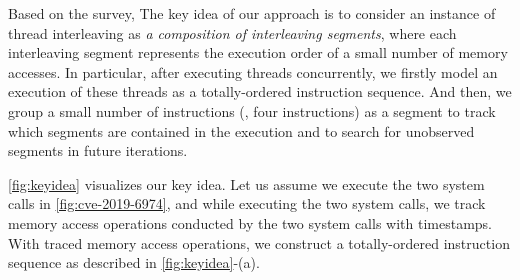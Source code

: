 %
\begin{figure}[t]
  \hfill
  \caption{}
  \label{fig:keyidea}
\end{figure}
%
Based on the survey, The key idea of our approach is to consider an
instance of thread interleaving as \textit{a composition of
  interleaving segments}, where each interleaving segment represents
the execution order of a small number of memory accesses.
%
In particular, after executing threads concurrently, we firstly model
an execution of these threads as a totally-ordered instruction
sequence.
%
And then, we group a small number of instructions (\eg, four
instructions) as a segment to track which segments are contained in
the execution and to search for unobserved segments in future
iterations.


\autoref{fig:keyidea} visualizes our key idea.
%
Let us assume we execute the two system calls in
\autoref{fig:cve-2019-6974}, and while executing the two system calls,
we track memory access operations conducted by the two system calls
with timestamps.
%
With traced memory access operations, we construct a totally-ordered
instruction sequence as described in \autoref{fig:keyidea}-(a).

